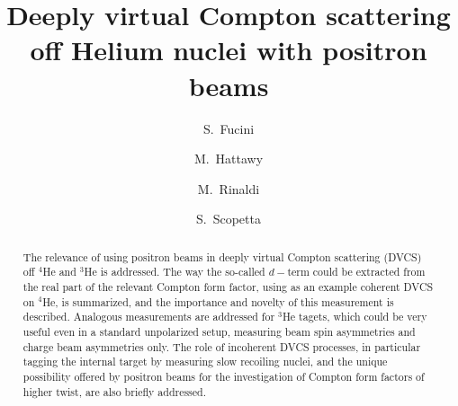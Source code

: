 \documentclass[times, twoside]{PosWhiPap}
\begin{document}
\title{Deeply virtual Compton scattering off Helium nuclei with positron beams}

\author[1]{S.~Fucini}
\author[2]{M.~Hattawy}
\author[1]{M.~Rinaldi}
\author[1]{S.~Scopetta}





\maketitle

\begin{abstract}
The relevance of using positron beams in deeply virtual Compton scattering 
   (DVCS) off $^4$He and $^3$He is addressed. The way the so-called $d-$term 
   could be extracted from the real part of the relevant Compton form factor, 
   using as an example coherent DVCS on $^4$He, is summarized, and the 
   importance and novelty of this measurement is described. Analogous 
   measurements are addressed for $^3$He tagets, which could be very useful 
   even in a standard unpolarized setup, measuring beam spin asymmetries and 
   charge beam asymmetries only. The role of incoherent DVCS processes, in 
   particular tagging the internal target by measuring slow recoiling nuclei,  
   and the unique possibility offered by positron beams for the investigation 
   of Compton form factors of higher twist, are also  briefly addressed.
\end {abstract}


\end{document}
